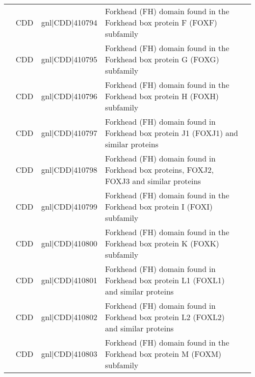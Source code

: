 \documentclass[../main.tex]{subfiles}
\begin{document}
\begin{landscape}
\begin{longtable}{@{}cllll@{}}
		                                & CDD                  & gnl|CDD|410794  & Forkhead (FH) domain found in the Forkhead box protein F (FOXF) subfamily                                                                    & \\
		                                & CDD                  & gnl|CDD|410795  & Forkhead (FH) domain found in the Forkhead box protein G (FOXG) subfamily                                                                    & \\
		                                & CDD                  & gnl|CDD|410796  & Forkhead (FH) domain found in the Forkhead box protein H (FOXH) subfamily                                                                    & \\
		                                & CDD                  & gnl|CDD|410797  & Forkhead (FH) domain found in Forkhead box protein J1 (FOXJ1) and similar proteins                                                           & \\
		                                & CDD                  & gnl|CDD|410798  & Forkhead (FH) domain found in Forkhead box proteins, FOXJ2, FOXJ3 and similar proteins                                                       & \\
		                                & CDD                  & gnl|CDD|410799  & Forkhead (FH) domain found in the Forkhead box protein I (FOXI) subfamily                                                                    & \\
		                                & CDD                  & gnl|CDD|410800  & Forkhead (FH) domain found in the Forkhead box protein K (FOXK) subfamily                                                                    & \\
		                                & CDD                  & gnl|CDD|410801  & Forkhead (FH) domain found in Forkhead box protein L1 (FOXL1) and similar proteins                                                           & \\
		                                & CDD                  & gnl|CDD|410802  & Forkhead (FH) domain found in Forkhead box protein L2 (FOXL2) and similar proteins                                                           & \\
		                                & CDD                  & gnl|CDD|410803  & Forkhead (FH) domain found in the Forkhead box protein M (FOXM) subfamily                                                                    & \\

\end{longtable}
\end{landscape}
\end{document}
